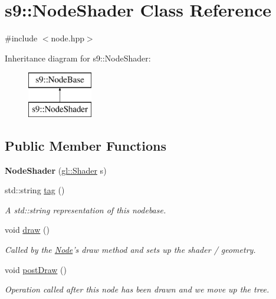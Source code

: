 \hypertarget{classs9_1_1NodeShader}{\section{s9\-:\-:Node\-Shader Class Reference}
\label{classs9_1_1NodeShader}
}


{\ttfamily \#include $<$node.\-hpp$>$}

Inheritance diagram for s9\-:\-:Node\-Shader\-:\begin{figure}[H]
\begin{center}
\leavevmode
\includegraphics[height=2.000000cm]{classs9_1_1NodeShader}
\end{center}
\end{figure}
\subsection*{Public Member Functions}
\begin{DoxyCompactItemize}
\item 
\hypertarget{classs9_1_1NodeShader_a4b4a98756e5f4b9cb139673a4c241279}{{\bfseries Node\-Shader} (\hyperlink{classs9_1_1gl_1_1Shader}{gl\-::\-Shader} s)}\label{classs9_1_1NodeShader_a4b4a98756e5f4b9cb139673a4c241279}

\item 
\hypertarget{classs9_1_1NodeShader_abaeef308b13a094f51423aaa13c823b1}{std\-::string \hyperlink{classs9_1_1NodeShader_abaeef308b13a094f51423aaa13c823b1}{tag} ()}\label{classs9_1_1NodeShader_abaeef308b13a094f51423aaa13c823b1}

\begin{DoxyCompactList}\small\item\em A std\-::string representation of this nodebase. \end{DoxyCompactList}\item 
\hypertarget{classs9_1_1NodeShader_a04d0081a5532830beef127123580e509}{void \hyperlink{classs9_1_1NodeShader_a04d0081a5532830beef127123580e509}{draw} ()}\label{classs9_1_1NodeShader_a04d0081a5532830beef127123580e509}

\begin{DoxyCompactList}\small\item\em Called by the \hyperlink{classs9_1_1Node}{Node}'s draw method and sets up the shader / geometry. \end{DoxyCompactList}\item 
\hypertarget{classs9_1_1NodeShader_ad8b39b9af895e511fb9f0ea099d37161}{void \hyperlink{classs9_1_1NodeShader_ad8b39b9af895e511fb9f0ea099d37161}{post\-Draw} ()}\label{classs9_1_1NodeShader_ad8b39b9af895e511fb9f0ea099d37161}

\begin{DoxyCompactList}\small\item\em Operation called after this node has been drawn and we move up the tree. \end{DoxyCompactList}\end{DoxyCompactItemize}
